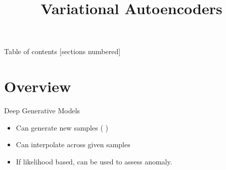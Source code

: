 \documentclass[10pt]{beamer}
\title{Variational Autoencoders}
\begin{document}
\maketitle

\begin{frame}{Table of contents}
  [sections numbered]
  \tableofcontents[hideallsubsections]
\end{frame}

\section{Overview}

\begin{frame}{Deep Generative Models}

\begin{itemize}
\item Can generate new samples ( )
\item Can interpolate across given samples
\item If likelihood based, can be used to assess anomaly.
\end{itemize}

\end{frame}
\end{document}
